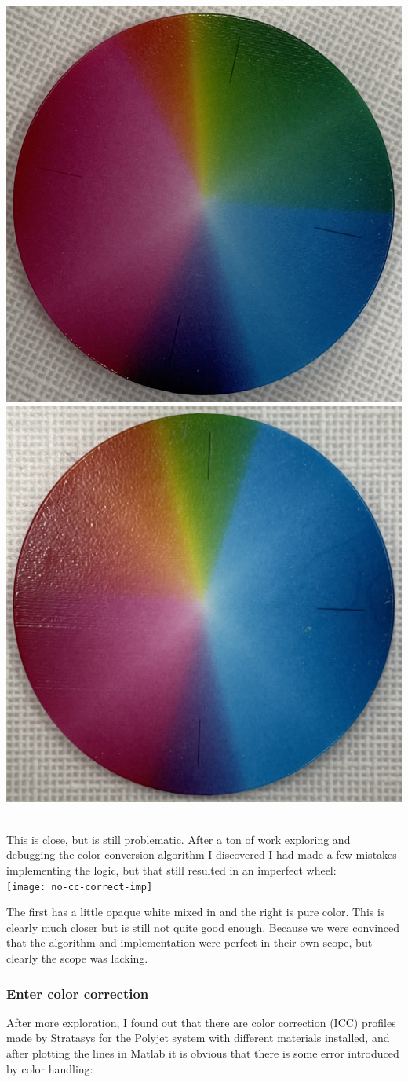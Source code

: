 \documentclass{article}
\begin{document}
\begin{multicols}{2}
\noindent
\includegraphics[width=0.5\columnwidth]{failed-color-wheel-1}
\includegraphics[width=0.5\columnwidth]{failed-color-wheel-2}
\

\noindent
This is close, but is still problematic. After a ton of work exploring and debugging the color conversion algorithm I discovered I had made a few mistakes implementing the logic, but that still resulted in an imperfect wheel:
\\

\noindent
\texttt{[image: no-cc-correct-imp]}
\

\noindent
The first has a little opaque white mixed in and the right is pure color. This is clearly much closer but is still not quite good enough. Because we were convinced that the algorithm and implementation were perfect in their own scope, but clearly the scope was lacking. 

\subsubsection{Enter color correction}

After more exploration, I found out that there are color correction (ICC) profiles made by Stratasys for the Polyjet system with different materials installed, and after plotting the lines in Matlab it is obvious that there is some error introduced by color handling:


\end{multicols}
\end{document}
